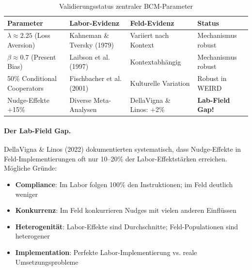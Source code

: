 \begin{table}[h]
\centering
\caption{Validierungsstatus zentraler BCM-Parameter}
\begin{tabular}{@{}llll@{}}
\toprule
\textbf{Parameter} & \textbf{Labor-Evidenz} & \textbf{Feld-Evidenz} & \textbf{Status} \\
\midrule
$\lambda \approx 2.25$ (Loss Aversion) & Kahneman \& Tversky (1979) & Variiert nach Kontext & Mechanismus robust \\
$\beta \approx 0.7$ (Present Bias) & Laibson et al. (1997) & Kontextabhängig & Mechanismus robust \\
50\% Conditional Cooperators & Fischbacher et al. (2001) & Kulturelle Variation & Robust in WEIRD \\
Nudge-Effekte +15\% & Diverse Meta-Analysen & DellaVigna \& Linos: +2\% & \textbf{Lab-Field Gap!} \\
\bottomrule
\end{tabular}
\end{table}

\paragraph{Der Lab-Field Gap.}
DellaVigna \& Linos (2022) dokumentierten systematisch, dass Nudge-Effekte in Feld-Implementierungen oft nur 10--20\% der Labor-Effektstärken erreichen. Mögliche Gründe:
\begin{itemize}
    \item \textbf{Compliance}: Im Labor folgen 100\% den Instruktionen; im Feld deutlich weniger
    \item \textbf{Konkurrenz}: Im Feld konkurrieren Nudges mit vielen anderen Einflüssen
    \item \textbf{Heterogenität}: Labor-Effekte sind Durchschnitte; Feld-Populationen sind heterogener
    \item \textbf{Implementation}: Perfekte Labor-Implementierung vs. reale Umsetzungsprobleme
\end{itemize}

